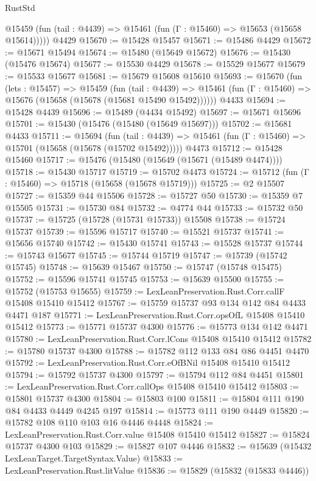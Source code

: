 \begin{lexlean}{RustStd}
\begin{coremodule}
{\begin{coremodule}
{{{{{{{{{{{{{{{{{{{{{{{{{{{{{{{{{{{{{{{{{{{{{{{{{{{{{{{{{{{{      @15459 (fun (tail : @4439) => @15461 (fun (Γ : @15460) => @15653 (@15658 @15614)))))
    @4429
@15670 := @15428 @15457
@15671 := @15486 @4429
@15672 := @15671 @15494
@15674 := @15480 (@15649 @15672)
@15676 := @15430 (@15476 @15674)
@15677 := @15530 @4429
@15678 := @15529 @15677
@15679 := @15533 @15677
@15681 := @15679 @15608 @15610
@15693 := @15670
    (fun (lets : @15457) =>
    @15459
      (fun (tail : @4439) =>
      @15461 (fun (Γ : @15460) => @15676 (@15658 (@15678 (@15681 @15490 @15492))))))
    @4433
@15694 := @15428 @4439
@15696 := @15489 (@4434 @15492)
@15697 := @15671 @15696
@15701 := @15430 (@15476 (@15480 (@15649 @15697)))
@15702 := @15681 @4433
@15711 := @15694
    (fun (tail : @4439) => @15461 (fun (Γ : @15460) => @15701 (@15658 (@15678 (@15702 @15492)))))
    @4473
@15712 := @15428 @15460
@15717 := @15476 (@15480 (@15649 (@15671 (@15489 @4474))))
@15718 := @15430 @15717
@15719 := @15702 @4473
@15724 := @15712 (fun (Γ : @15460) => @15718 (@15658 (@15678 @15719)))
@15725 := @2 @15507
@15727 := @15359 @44 @15506
@15728 := @15727 @50
@15730 := @15359 @7 @15505
@15731 := @15730 @84
@15732 := @4774 @44
@15733 := @15732 @50
@15737 := @15725 (@15728 (@15731 @15733)) @15508
@15738 := @15724 @15737
@15739 := @15596 @15717
@15740 := @15521 @15737
@15741 := @15656 @15740
@15742 := @15430 @15741
@15743 := @15528 @15737
@15744 := @15743 @15677
@15745 := @15744 @15719
@15747 := @15739 (@15742 @15745)
@15748 := @15639 @15467
@15750 := @15747 (@15748 @15475)
@15752 := @15596 @15741 @15745
@15753 := @15639 @15500
@15755 := @15752 (@15753 @15655)
@15759 := LexLeanPreservation.Rust.Corr.callF @15408 @15410 @15412
@15767 := @15759 @15737 @93 @134 @142 @84 @4433 @4471 @187
@15771 := LexLeanPreservation.Rust.Corr.opsOfL @15408 @15410 @15412
@15773 := @15771 @15737 @4300
@15776 := @15773 @134 @142 @4471
@15780 := LexLeanPreservation.Rust.Corr.lCons @15408 @15410 @15412
@15782 := @15780 @15737 @4300
@15788 := @15782 @112 @133 @84 @86 @4451 @4470
@15792 := LexLeanPreservation.Rust.Corr.eOfBNil @15408 @15410 @15412
@15794 := @15792 @15737 @4300
@15797 := @15794 @112 @84 @4451
@15801 := LexLeanPreservation.Rust.Corr.callOps @15408 @15410 @15412
@15803 := @15801 @15737 @4300
@15804 := @15803 @100
@15811 := @15804 @111 @190 @84 @4433 @4449 @4245 @197
@15814 := @15773 @111 @190 @4449
@15820 := @15782 @108 @110 @103 @16 @4446 @4448
@15824 := LexLeanPreservation.Rust.Corr.value @15408 @15410 @15412
@15827 := @15824 @15737 @4300 @103
@15829 := @15827 @107 @4446
@15832 := @15639 (@15432 LexLeanTarget.TargetSyntax.Value)
@15833 := LexLeanPreservation.Rust.litValue
@15836 := @15829 (@15832 (@15833 @4446))
}}}}}}}}}}}}}}}}}}}}}}}}}}}}}}}}}}}}}}}}}}}}}}}}}}}}}}}}}}}}
\end{coremodule}}
\end{coremodule}
\end{lexlean}

